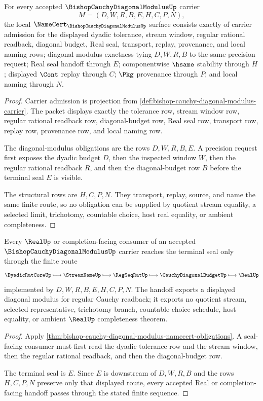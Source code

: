 \begin{theorem}
\label{thm:bishop-cauchy-diagonal-modulus-namecert-obligations}
For every accepted $\BishopCauchyDiagonalModulusUp$ carrier
$$
M=(D,W,R,B,E,H,C,P,N),
$$
the local $\NameCert_{\BishopCauchyDiagonalModulusUp}$ surface consists exactly of carrier admission for the displayed dyadic tolerance, stream window, regular rational readback, diagonal budget, Real seal, transport, replay, provenance, and local naming rows; diagonal-modulus exactness tying $D,W,R,B$ to the same precision request; Real seal handoff through $E$; componentwise $\hsame$ stability through $H$; displayed $\Cont$ replay through $C$; $\Pkg$ provenance through $P$; and local naming through $N$.
\end{theorem}
\begin{proof}
Carrier admission is projection from \autoref{def:bishop-cauchy-diagonal-modulus-carrier}. The packet displays exactly the tolerance row, stream window row, regular rational readback row, diagonal-budget row, Real seal row, transport row, replay row, provenance row, and local naming row.

The diagonal-modulus obligations are the rows $D,W,R,B,E$. A precision request first exposes the dyadic budget $D$, then the inspected window $W$, then the regular rational readback $R$, and then the diagonal-budget row $B$ before the terminal seal $E$ is visible.

The structural rows are $H,C,P,N$. They transport, replay, source, and name the same finite route, so no obligation can be supplied by quotient stream equality, a selected limit, trichotomy, countable choice, host real equality, or ambient completeness.
\end{proof}

\begin{theorem}
\label{thm:bishop-cauchy-diagonal-modulus-real-seal-handoff}
Every $\RealUp$ or completion-facing consumer of an accepted $\BishopCauchyDiagonalModulusUp$ carrier reaches the terminal seal only through the finite route
$$
\DyadicRatCoreUp \longmapsto \StreamNameUp \longmapsto \RegSeqRatUp \longmapsto \CauchyDiagonalBudgetUp \longmapsto \RealUp
$$
implemented by $D,W,R,B,E,H,C,P,N$. The handoff exports a displayed diagonal modulus for regular Cauchy readback; it exports no quotient stream, selected representative, trichotomy branch, countable-choice schedule, host equality, or ambient $\RealUp$ completeness theorem.
\end{theorem}
\begin{proof}
Apply \autoref{thm:bishop-cauchy-diagonal-modulus-namecert-obligations}. A seal-facing consumer must first read the dyadic tolerance row and the stream window, then the regular rational readback, and then the diagonal-budget row.

The terminal seal is $E$. Since $E$ is downstream of $D,W,R,B$ and the rows $H,C,P,N$ preserve only that displayed route, every accepted Real or completion-facing handoff passes through the stated finite sequence.
\end{proof}

